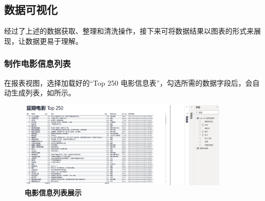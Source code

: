 





\subsection{数据可视化}

经过了上述的数据获取、整理和清洗操作，接下来可将数据结果以图表的形式来展现，让数据更易于理解。

\subsubsection{制作电影信息列表}

在报表视图，选择加载好的``Top 250 电影信息表''，勾选所需的数据字段后，会自动生成列表，如所示。

\begin{figure}[htbp]
    \centering
    \includegraphics[width=0.9\textwidth]{figure/PowerBI/douban_movie_list.png}
    \caption{\textbf{电影信息列表展示}}
    \label{fig:douban_movie_list}
\end{figure}

